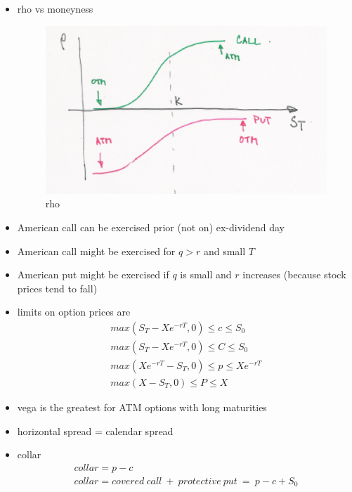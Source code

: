 \begin{itemize}
\item rho vs moneyness
\begin{figure}[htp]
\centering
\includegraphics[scale = 0.75]{rho.eps}
\caption{rho}
\label{rho}
\end{figure}
\item American call can be exercised prior (not on) ex-dividend day
\item American call might be exercised for $q > r$ and small $T$
\item American put might be exercised if $q$ is small and $r$ increases (because stock prices tend to fall)
\item limits on option prices are
\begin{gather*}
max(S_T - Xe^{-rT}, 0)\le c \le S_0\\
max(S_T - Xe^{-rT}, 0)\le C \le S_0\\
max(Xe^{-rT} - S_T, 0)\le p \le X e^{-rT}\\
max(X - S_T, 0)\le P \le X
\end{gather*}
\item vega is the greatest for ATM options with long maturities
\item horizontal spread = calendar spread
\item collar
\begin{gather*}
collar = p - c\\
collar = covered~call~+~protective~put~=~p - c + S_0
\end{gather*}
\begin{figure}[htp]
\centering

\end{figure}
\end{itemize}
